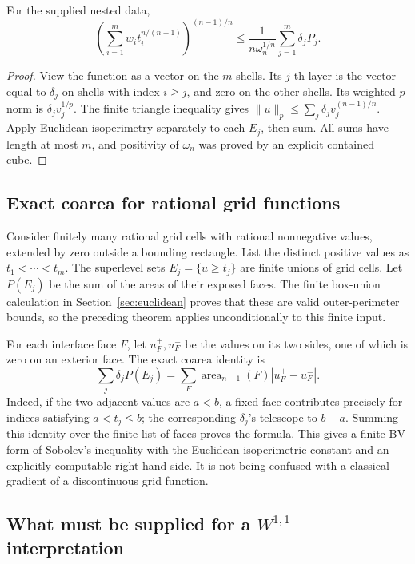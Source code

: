 \begin{theorem}
\label{thm:layered-sobolev}
For the supplied nested data,
\[
 \left(\sum_{i=1}^m w_i t_i^{n/(n-1)}\right)^{(n-1)/n}
 \leq \frac1{n\omega_n^{1/n}}\sum_{j=1}^m\delta_jP_j.
\]
\end{theorem}
\begin{proof}
View the function as a vector on the \(m\) shells. Its \(j\)-th
layer is the vector equal to \(\delta_j\) on shells with index
\(i\geq j\), and zero on the other shells. Its weighted \(p\)-norm
is \(\delta_jv_j^{1/p}\). The finite triangle inequality gives
\(\|u\|_p\leq\sum_j\delta_jv_j^{(n-1)/n}\).
Apply Euclidean isoperimetry separately to each \(E_j\), then sum.
All sums have length at most \(m\), and positivity of \(\omega_n\)
was proved by an explicit contained cube.
\end{proof}

\subsection{Exact coarea for rational grid functions}

Consider finitely many rational grid cells with rational nonnegative
values, extended by zero outside a bounding rectangle. List the distinct
positive values as \(t_1<\cdots<t_m\). The superlevel sets
\(E_j=\{u\geq t_j\}\) are finite unions of grid cells. Let
\(P(E_j)\) be the sum of the areas of their exposed faces.
The finite box-union calculation in Section~\ref{sec:euclidean} proves
that these are valid outer-perimeter bounds, so the preceding theorem
applies unconditionally to this finite input.

For each interface face \(F\), let \(u_F^+,u_F^-\) be the values
on its two sides, one of which is zero on an exterior face. The exact
coarea identity is
\[
 \sum_j\delta_jP(E_j)
 =\sum_F\operatorname{area}_{n-1}(F)|u_F^+-u_F^-|.
\]
Indeed, if the two adjacent values are \(a<b\), a fixed face contributes
precisely for indices satisfying \(a<t_j\leq b\); the corresponding
\(\delta_j\)'s telescope to \(b-a\). Summing this
identity over the finite list of faces proves the formula. This gives a
finite BV form of Sobolev's inequality with the Euclidean isoperimetric
constant and an explicitly
computable right-hand side. It is not being confused with a classical
gradient of a discontinuous grid function.

\subsection{What must be supplied for a \(W^{1,1}\) interpretation}

